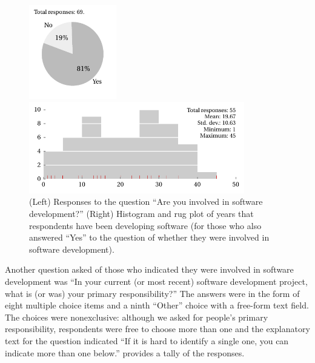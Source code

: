 \documentclass{casicswhitepaper}
\begin{document}

\begin{figure}[thb]
  \vspace*{1ex}
  \hspace*{0.25in}
  \begin{minipage}[b]{0.3\linewidth}
    \includegraphics[width=1.5in]{files/plots/number-of-developers.pdf}
  \end{minipage}%
  \begin{minipage}[b]{0.75\linewidth}
    \includegraphics[width=3.7in]{files/plots/histogram-years.pdf}
  \end{minipage}%
  \vspace*{-2ex}
  \caption{(Left) Responses to the question  ``Are you involved in software development?'' (Right) Histogram and rug plot of years that respondents have been developing software (for those who also answered ``Yes'' to the question of whether they were involved in software development).}
  \label{years}
\end{figure}

Another question asked of those who indicated they were involved in software development was ``In your current (or most recent) software development project, what is (or was) your primary responsibility?'' The answers were in the form of eight multiple choice items and a ninth ``Other'' choice with a free-form text field.  The choices were nonexclusive: although we asked for people's primary responsibility, respondents were free to choose more than one and the explanatory text for the question indicated ``If it is hard to identify a single one, you can indicate more than one below.''   provides a tally of the responses.
\end{document}

